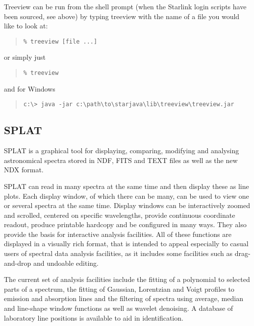 \documentclass[twoside,11pt]{article}
\newcommand{\xlabel}[1]{}
\renewcommand{\_}{\texttt{\symbol{95}}}
\begin{document}
Treeview can be run from the shell prompt (when the Starlink login scripts have 
been sourced, see above) by typing treeview with the name of a
file you would like to look at:

\begin{quote}
\begin{verbatim}
% treeview [file ...]
\end{verbatim}
\end{quote}

or simply just

\begin{quote}
\begin{verbatim}
% treeview
\end{verbatim}
\end{quote}

and for Windows

\begin{quote}
\begin{verbatim}
c:\> java -jar c:\path\to\starjava\lib\treeview\treeview.jar
\end{verbatim}
\end{quote}

\subsection{\label{splat}\xlabel{splat}SPLAT}

SPLAT is a graphical tool for displaying, comparing, modifying and analysing 
astronomical spectra stored in NDF, FITS and TEXT files as well as the new 
NDX format. 

SPLAT can read in many spectra at the same time and then display these 
as line plots. Each display window, of which there can be many, can be used to 
view one or several spectra at the same time. Display windows can be interactively 
zoomed and scrolled, centered on specific wavelengths, provide continuous 
coordinate readout, produce printable hardcopy and be configured in many ways. 
They also provide the basis for interactive analysis facilities. All of these 
functions are displayed in a visually rich format, that is intended to appeal 
especially to casual users of spectral data analysis facilities, as it includes 
some facilities such as drag-and-drop and undoable editing.

The current set of analysis facilities include the fitting of a polynomial to 
selected parts of a spectrum, the fitting of Gaussian, Lorentzian and Voigt profiles 
to emission and absorption lines and the filtering of spectra using average, median 
and line-shape window functions as well as wavelet denoising. A database of laboratory 
line positions is available to aid in identification.
\end{document}
